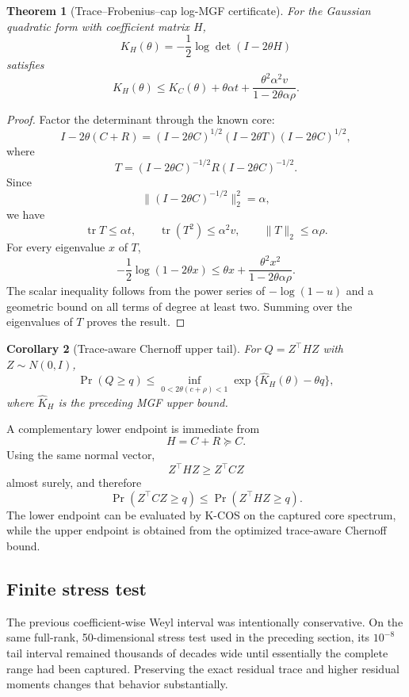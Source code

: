 \documentclass[11pt]{article}
\newtheorem{theorem}{Theorem}[section]
\newtheorem{corollary}[theorem]{Corollary}
\theoremstyle{definition}
\theoremstyle{remark}
\begin{document}
\begin{theorem}[Trace--Frobenius--cap log-MGF certificate]\label{claim:final-23-2}
For the Gaussian quadratic form with coefficient matrix \(H\),
\[
K_H(\theta)
=-\frac12\log\det(I-2\theta H)
\]
satisfies
\[
\boxed{
K_H(\theta)
\le
K_C(\theta)
+
\theta\alpha t
+
\frac{\theta^2\alpha^2v}
     {1-2\theta\alpha\rho}.
}
\]
\end{theorem}

\begin{proof}
Factor the determinant through the known core:
\[
I-2\theta(C+R)
=
(I-2\theta C)^{1/2}
(I-2\theta T)
(I-2\theta C)^{1/2},
\]
where
\[
T=(I-2\theta C)^{-1/2}
R
(I-2\theta C)^{-1/2}.
\]
Since
\[
\|(I-2\theta C)^{-1/2}\|_2^2=\alpha,
\]
we have
\[
\operatorname{tr}T\le\alpha t,
\qquad
\operatorname{tr}(T^2)\le\alpha^2v,
\qquad
\|T\|_2\le\alpha\rho.
\]
For every eigenvalue \(x\) of \(T\),
\[
-\frac12\log(1-2\theta x)
\le
\theta x
+
\frac{\theta^2x^2}
     {1-2\theta\alpha\rho}.
\]
The scalar inequality follows from the power series of \(-\log(1-u)\) and a
geometric bound on all terms of degree at least two.  Summing over the
eigenvalues of \(T\) proves the result.
\end{proof}

\begin{corollary}[Trace-aware Chernoff upper tail]\label{claim:final-23-3}
For \(Q=Z^\top HZ\) with \(Z\sim N(0,I)\),
\[
\boxed{
\Pr(Q\ge q)
\le
\inf_{0<2\theta(c+\rho)<1}
\exp\{\widehat K_H(\theta)-\theta q\},
}
\]
where \(\widehat K_H\) is the preceding MGF upper bound.
\end{corollary}

A complementary lower endpoint is immediate from
\[
H=C+R\succeq C.
\]
Using the same normal vector,
\[
Z^\top HZ\ge Z^\top CZ
\]
almost surely, and therefore
\[
\boxed{
\Pr(Z^\top CZ\ge q)
\le
\Pr(Z^\top HZ\ge q).
}
\]
The lower endpoint can be evaluated by K-COS on the captured core spectrum,
while the upper endpoint is obtained from the optimized trace-aware Chernoff
bound.

\subsection{Finite stress test}

The previous coefficient-wise Weyl interval was intentionally conservative.
On the same full-rank, 50-dimensional stress test used in the preceding
section, its \(10^{-8}\) tail interval remained thousands of decades wide
until essentially the complete range had been captured.  Preserving the exact
residual trace and higher residual moments changes that behavior substantially.
\end{document}
